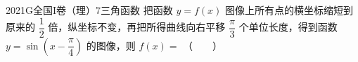 
\begin{problem}{2021}{G}{全国I卷（理）}{7}{三角函数}
把函数 $ y=f(x) $ 图像上所有点的横坐标缩短到原来的 $ \dfrac{1}{2} $ 倍，纵坐标不变，再把所得曲线向右平移 $ \dfrac{\pi}{3} $ 个单位长度，得到函数 $ y=\sin\left(x-\dfrac{\pi}{4}\right) $ 的图像，则 $ f(x)= $ \hspace{1cm}（　　）
\begin{choices}
\end{choices}
\end{problem}

\begin{answer}

\end{answer}

\begin{solutions}

\end{solutions}